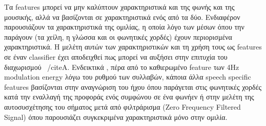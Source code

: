 
Τα features μπορεί να μην καλύπτουν χαρακτηριστικά και της φωνής και
της μουσικής, αλλά να βασίζονται σε χαρακτηριστικά ενός από τα
δύο. Ενδιαφέρον παρουσιάζουν τα χαρακτηριστικά της ομιλίας, η οποία
λόγο των μέσων όπου την παράγουν (τα χείλη, η γλώσσα και οι φωνητικές
χορδές) έχουν περιορισμένα χαρακτηριστικά. Η μελέτη αυτών των
χαρακτηριστικών και τη χρήση τους ως features σε έναν classifier έχει
αποδειχθεί πως μπορεί να αυξήσει στην επιτυχία του διαχωρισμού
~/cite{Α}. Ενδεικτικά , πέρα από το καθιερωμένο feature των 4Hz
modulation energy λόγω του ρυθμού των συλλαβών, κάποια άλλα speech
specific features βασίζονται στην αναγνώριση του ήχου όπου παράγεται
στις φωνητικές χορδές κατά την εναλλαγή της προφοράς ενός συμφώνου σε
ένα φωνήεν ή στην μελέτη της αυτοσυσχέτησης του σήματος μετά από
φιλτράρισμα (Zero Frequency Filtered Signal) όπου παρουσιάζει
συγκεκριμένα χαρακτηριστικά μόνο στην ομιλία.

